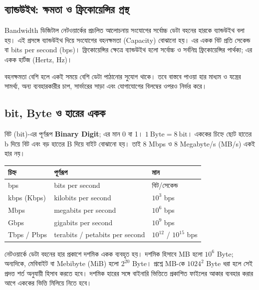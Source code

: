 \subsection{ব্যান্ডউইথ: ক্ষমতা ও ফ্রিকোয়েন্সির প্রস্থ}
\label{ch2:c01-08}
\begin{definitionbox}{Bandwidth}
ডিজিটাল নেটওয়ার্কের প্রচলিত আলোচনায় সংযোগের সর্বোচ্চ ডেটা বহনের হারকে ব্যান্ডউইথ বলা হয়। এই প্রসঙ্গে ব্যান্ডউইথ দিয়ে সংযোগের বহনক্ষমতা (Capacity) বোঝানো হয়। এর একক বিট প্রতি সেকেন্ড বা bits per second (bps)। ফ্রিকোয়েন্সির ক্ষেত্রে ব্যান্ডউইথ হলো সর্বোচ্চ ও সর্বনিম্ন ফ্রিকোয়েন্সির পার্থক্য; এর একক হার্টজ (Hertz, Hz)।
\end{definitionbox}
বহনক্ষমতা বেশি হলে একই সময়ে বেশি ডেটা পাঠানোর সুযোগ থাকে। তবে বাস্তবে পাওয়া হার মাধ্যম ও যন্ত্রের সামর্থ্য, অন্য ব্যবহারকারীর চাপ, সার্ভারের সাড়া এবং যোগাযোগের বিলম্বের ওপরও নির্ভর করে।

\subsection{bit, Byte ও হারের একক}
\label{ch2:c01-09}
বিট (bit)-এর পূর্ণরূপ \textbf{Binary Digit}; এর মান 0 বা 1। $1\ \mathrm{Byte}=8\ \mathrm{bit}$। এককের চিহ্নে ছোট হাতের b দিয়ে বিট এবং বড় হাতের B দিয়ে বাইট বোঝানো হয়। তাই 8 Mbps ও 8 Megabyte/s (MB/s) একই হার নয়।
\begin{tabularx}{\linewidth}{|p{.18\linewidth}|X|p{.28\linewidth}|}
\hline
\textbf{চিহ্ন} & \textbf{পূর্ণরূপ} & \textbf{মান}\\\hline
bps & bits per second & বিট/সেকেন্ড\\\hline
kbps (Kbps) & kilobits per second & $10^3$ bps\\\hline
Mbps & megabits per second & $10^6$ bps\\\hline
Gbps & gigabits per second & $10^9$ bps\\\hline
Tbps / Pbps & terabits / petabits per second & $10^{12}$ / $10^{15}$ bps\\\hline
\end{tabularx}
নেটওয়ার্কে ডেটা বহনের হার প্রকাশে দশমিক একক ব্যবহৃত হয়। দশমিক হিসাবে MB হলো $10^6$ Byte; অন্যদিকে, মেবিবাইট বা Mebibyte (MiB) হলো $2^{20}$ Byte। প্রশ্নে MB-কে $1024^2$ Byte ধরা হলে সেই প্রদত্ত শর্ত অনুযায়ী হিসাব করতে হবে। দশমিক হারের সঙ্গে বাইনারি ভিত্তিতে প্রকাশিত ফাইলের আকার ব্যবহার করার আগে এককের ভিত্তি মিলিয়ে নিতে হবে।

